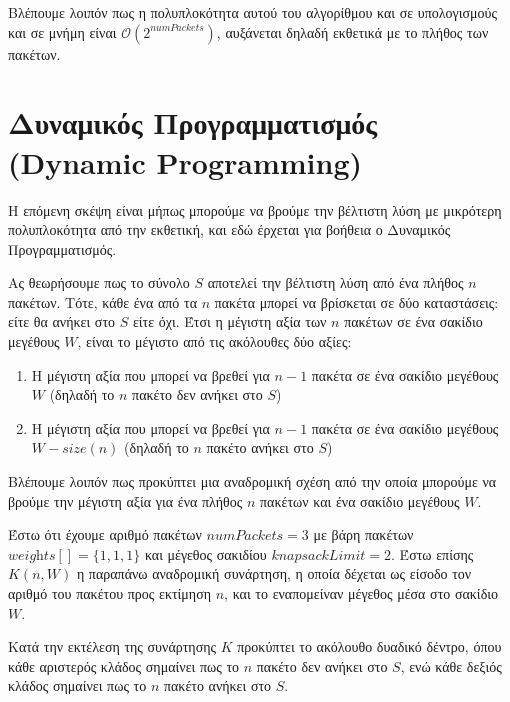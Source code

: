 \documentclass{article}
\begin{document}
Βλέπουμε λοιπόν πως η πολυπλοκότητα αυτού του αλγορίθμου και σε υπολογισμούς και
σε μνήμη είναι $\mathcal{O}\left(2^{\textit{numPackets}}\right)$, αυξάνεται
δηλαδή εκθετικά με το πλήθος των πακέτων.

\section{Δυναμικός Προγραμματισμός (Dynamic Programming)}

Η επόμενη σκέψη είναι μήπως μπορούμε να βρούμε την βέλτιστη λύση με μικρότερη
πολυπλοκότητα από την εκθετική, και εδώ έρχεται για βοήθεια ο Δυναμικός
Προγραμματισμός.

Ας θεωρήσουμε πως το σύνολο $S$ αποτελεί την βέλτιστη λύση από ένα πλήθος $n$
πακέτων. Τότε, κάθε ένα από τα $n$ πακέτα μπορεί να βρίσκεται σε δύο
καταστάσεις: είτε θα ανήκει στο $S$ είτε όχι. Έτσι η μέγιστη αξία των $n$
πακέτων σε ένα σακίδιο μεγέθους $W$, είναι το μέγιστο από τις ακόλουθες δύο
αξίες:

\begin{enumerate}
    \item Η μέγιστη αξία που μπορεί να βρεθεί για $n-1$ πακέτα σε ένα σακίδιο
            μεγέθους $W$ (δηλαδή το $n$ πακέτο δεν ανήκει στο $S$)
    \item Η μέγιστη αξία που μπορεί να βρεθεί για $n-1$ πακέτα σε ένα σακίδιο
            μεγέθους $W-\textit{size}(n)$ (δηλαδή το $n$ πακέτο ανήκει στο $S$)
\end{enumerate}

Βλέπουμε λοιπόν πως προκύπτει μια αναδρομική σχέση από την οποία μπορούμε να
βρούμε την μέγιστη αξία για ένα πλήθος $n$ πακέτων και ένα σακίδιο μεγέθους $W$.

Έστω ότι έχουμε αριθμό πακέτων $\textit{numPackets}=3$ με βάρη πακέτων
$\textit{weights}[]=\{1, 1, 1\}$ και μέγεθος σακιδίου
$\textit{knapsackLimit}=2$. Έστω επίσης $K(n, W)$ η παραπάνω αναδρομική
συνάρτηση, η οποία δέχεται ως είσοδο τον αριθμό του πακέτου προς εκτίμηση $n$,
και το εναπομείναν μέγεθος μέσα στο σακίδιο $W$.

Κατά την εκτέλεση της συνάρτησης $K$ προκύπτει το ακόλουθο δυαδικό δέντρο, όπου
κάθε αριστερός κλάδος σημαίνει πως το $n$ πακέτο δεν ανήκει στο $S$, ενώ
κάθε δεξιός κλάδος σημαίνει πως το $n$ πακέτο ανήκει στο $S$.

\begin{center}
\end{center}
\end{document}
